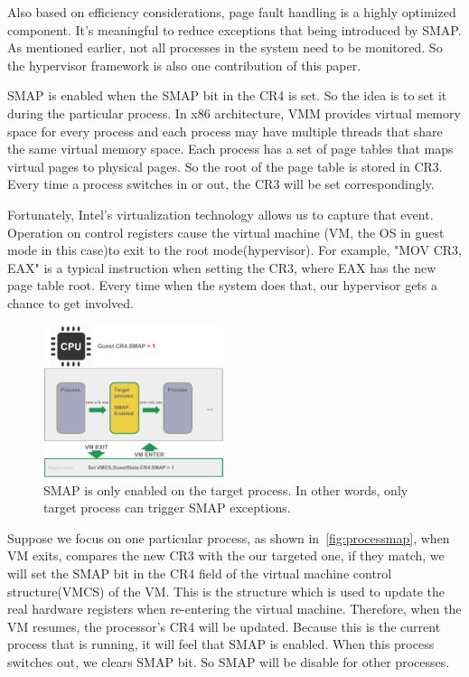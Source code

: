 Also based on efficiency considerations, page fault handling is a highly optimized component. It's meaningful to reduce exceptions that being introduced by SMAP. As mentioned earlier, not all processes in the system need to be monitored. So the hypervisor framework is also one contribution of this paper. 

SMAP is enabled when the SMAP bit in the CR4 is set. So the idea is to set it during the particular process. In x86 architecture, VMM provides virtual memory space for every process and each process may have multiple threads that share the same virtual memory space. Each process has a set of page tables that maps virtual pages to physical pages. So the root of the page table is stored in CR3. Every time a process switches in or out, the CR3 will be set correspondingly.

Fortunately, Intel's virtualization technology allows us to capture that event. Operation on control registers cause the virtual machine (VM, the OS in guest mode in this case)to exit to the root mode(hypervisor). For example, "MOV CR3, EAX" is a typical instruction when setting the CR3, where EAX has the new page table root. Every time when the system does that, our hypervisor gets a chance to get involved.

\begin{figure}[th]
  \includegraphics[width=0.47\textwidth]{figures/processmap}
  \centering
  \caption{SMAP is only enabled on the target process. In other words, only target process can trigger SMAP exceptions.}
  \label{fig:processmap}
\end{figure}

Suppose we focus on one particular process, as shown in~\autoref{fig:processmap}, when VM exits, compares the new CR3 with the our targeted one, if they match, we will set the SMAP bit in the CR4 field of the virtual machine control structure(VMCS) of the VM. This is the structure which is used to update the real hardware registers when re-entering the virtual machine. Therefore, when the VM resumes, the processor's CR4 will be updated. Because this is the current process that is running, it will feel that SMAP is enabled. When this process switches out, we clears SMAP bit. So SMAP will be disable for other processes.

